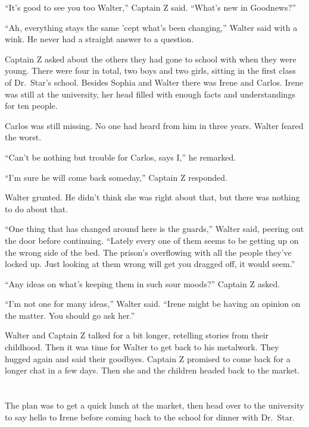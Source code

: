\documentclass[12pt]{extbook}
\begin{document}
  \enquote{It's good to see you too Walter,} Captain Z said.
  \enquote{What's new in Goodnews?}
  
  \enquote{Ah, everything stays the same 'cept what's been changing,}
  Walter said with a wink. He never had a straight answer to a question.
  
  Captain Z asked about the others they had gone to school with when they
  were young. There were four in total, two boys and two girls, sitting in
  the first class of Dr.~Star's school. Besides Sophia and Walter there
  was Irene and Carlos. Irene was still at the university, her head filled
  with enough facts and understandings for ten people.
  
  Carlos was still missing. No one had heard from him in three years.
  Walter feared the worst.
  
  \enquote{Can't be nothing but trouble for Carlos, says I,} he remarked.
  
  \enquote{I'm sure he will come back someday,} Captain Z responded.
  
  Walter grunted. He didn't think she was right about that, but there was
  nothing to do about that.
  
  \enquote{One thing that has changed around here is the guards,} Walter
  said, peering out the door before continuing. \enquote{Lately every one
  of them seems to be getting up on the wrong side of the bed. The
  prison's overflowing with all the people they've locked up. Just looking
  at them wrong will get you dragged off, it would seem.}
  
  \enquote{Any ideas on what's keeping them in such sour moods?} Captain Z
  asked.
  
  \enquote{I'm not one for many ideas,} Walter said. \enquote{Irene might
  be having an opinion on the matter. You should go ask her.}
  
  Walter and Captain Z talked for a bit longer, retelling stories from
  their childhood. Then it was time for Walter to get back to his
  metalwork. They hugged again and said their goodbyes. Captain Z promised
  to come back for a longer chat in a few days. Then she and the children
  headed back to the market.
  
  \section{}\label{section-30}
  
  The plan was to get a quick lunch at the market, then head over to the
  university to say hello to Irene before coming back to the school for
  dinner with Dr.~Star.
  
\end{document}
